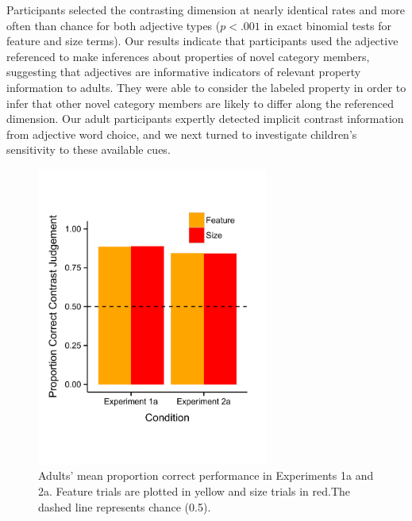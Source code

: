 \documentclass[10pt,letterpaper]{article}
\begin{document}
Participants selected the contrasting dimension at nearly identical rates and more often than chance for both adjective types ($p < .001$ in exact binomial tests for feature and size terms).  Our results indicate that participants used the adjective referenced to make inferences about properties of novel category members, suggesting that adjectives are informative indicators of relevant property information to adults.  They were able to consider the labeled property in order to infer that other novel category members are likely to differ along the referenced dimension.  Our adult participants expertly detected implicit contrast information from adjective word choice, and we next turned to investigate children's sensitivity to these available cues.  


	
\begin{figure}[t] 
  \begin{center} 
    \includegraphics[width=3in]{figures/adults2.pdf} 
    \caption{\label{fig:res5} Adults' mean proportion correct performance in Experiments 1a and 2a. Feature trials are plotted in yellow and size trials in red.The dashed line represents chance (0.5). }
  \end{center} 
\end{figure}	
\end{document}

